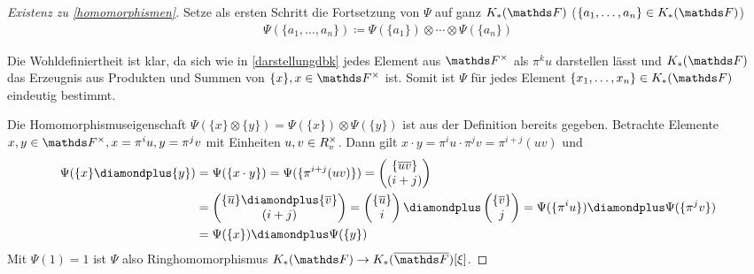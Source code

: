 \documentclass[ngerman,fontsize=11pt, paper=a4, parskip=half, titlepage=true, toc=bib]{scrartcl}
\begin{document}
\begin{proof}[Existenz zu \ref{homomorphismen}]
  Setze als ersten Schritt die Fortsetzung von $\Psi$ auf ganz $\KF$
  ($\{a_1,\dotsc,a_n\}\in\KF$)
  \begin{gather*}
    \Psi(\{a_1,\dotsc,a_n\})
    \coloneqq \Psi(\{a_1\})\otimes\dotsb\otimes\Psi(\{a_n\})
  \end{gather*}

  Die Wohldefiniertheit ist klar, da sich wie in \ref{darstellungdbk}
  jedes Element aus $\Fx$ als $\pi^k u$ darstellen lässt und
  $\KF$ das Erzeugnis aus Produkten und Summen von $\{x\}, x\in\Fx$
  ist. Somit ist $\Psi$ für jedes Element $\{x_1,\dotsc,x_n\}\in\KF$ 
  eindeutig bestimmt.

  Die Homomorphismuseigenschaft
  $\Psi(\{x\}\otimes\{y\})=\Psi(\{x\})\otimes\Psi(\{y\})$
  ist aus der Definition bereits gegeben.
  Betrachte Elemente $x,y\in\Fx, x=\pi^iu, y=\pi^jv$ mit Einheiten
  $u,v\in R^\times_v$. 
  Dann gilt $x\cdot y=\pi^iu\cdot\pi^jv=\pi^{i+j}(uv)$  und
  \begin{align*}
    \Psi(\{x\}\p\{y\})
    &=\Psi(\{x\cdot y\})=\Psi(\{\pi^{i+j}(uv)\})
      =\begin{pmatrix}\{\ov{uv}\}\\(i+j)\end{pmatrix}\\
    &=\begin{pmatrix}\{\ov u \}\p \{\ov v\}\\(i+j)\end{pmatrix}
    = \begin{pmatrix}\{\ov u\}\\i\end{pmatrix}
    \p\begin{pmatrix}\{\ov v\}\\j\end{pmatrix}
    =\Psi(\{\pi^iu\})\p \Psi(\{\pi^jv\})\\
    &= \Psi(\{x\})\p\Psi(\{y\})
  \end{align*}
  Mit $\Psi(1)=1$ ist $\Psi$ also Ringhomomorphismus $\KF\to\KbF[\xi]$.


\end{proof}
\end{document}
